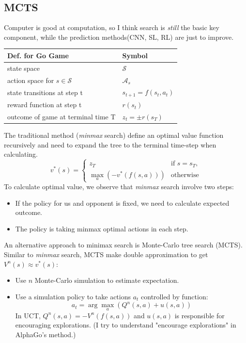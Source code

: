 \documentclass{mcmthesis}
\begin{document}
\subsection{MCTS}
Computer is good at computation, so I think search is \textit{still} the basic key component, while the prediction methods(CNN, SL, RL) are just to improve.
\begin{center}

\begin{tabular}{ll}
	\toprule
	Def. for Go Game & Symbol  \\ 
	\midrule
	state space & $\mathcal{S}$  \\ 
	 
	action space for $s \in \mathcal{S}$& $\mathcal{A}_s$ \\ 
	
	state transitions at step t& $s_{t+1}=f(s_t,a_t)$ \\ 
	 
	reward function at step t & $r(s_t)$  \\
	
	outcome of game at terminal time T & $z_t=\pm r(s_T)$  \\
	\bottomrule 
\end{tabular} 
\end{center}

The traditional method (\textit{minmax} search) define an optimal value function   recursively  and need to expand the tree to the terminal time-step when calculating. 
\begin{equation}\label{eq1}
v^*(s)=\left\{
	\begin{array}{ll}
	z_T & \text{if  } s=s_T\text{,}\\
	\displaystyle \max_a \left(-v^*(f(s,a))\right) & \text{otherwise}
	\end{array}
	\right.
\end{equation}
To calculate optimal value, we observe that \textit{minmax} search involve two steps: 
\begin{itemize}[noitemsep]
	\item If the policy for us and opponent is fixed, we need to calculate expected outcome.
	\item   The policy is taking minmax optimal actions in each step. 	
\end{itemize}

An alternative approach to minimax search is Monte-Carlo tree search (MCTS). Similar to \textit{minmax} search, MCTS make double approximation to get $V^n(s) \approx v^*(s)$: 
\begin{itemize}[noitemsep]
	\item Use $n$ Monte-Carlo simulation to estimate expectation.
	\item Use a  simulation policy to take actions $a_t$ controlled by function: \begin{equation}\label{eq2}
	a_t=\displaystyle {\arg \max_a} (Q^n(s,a)+u(s,a)) 
	\end{equation}
	 In UCT,  $Q^n(s,a)=-V^n(f(s,a))$ and $u(s,a)$ is responsible for encouraging explorations. (I try to understand "encourage explorations" in AlphaGo's method.)
\end{itemize}
\end{document}
